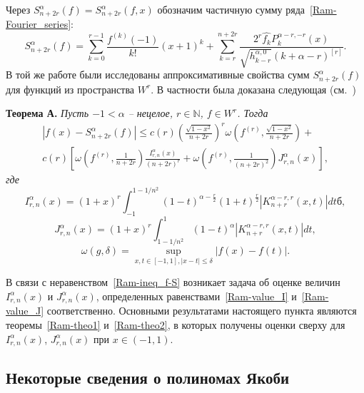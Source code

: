 Через $S^\alpha_{n+2r}(f)=S^\alpha_{n+2r}(f,x)$ обозначим частичную сумму ряда~\eqref{Ram-Fourier_series}:
$$
S^\alpha_{n+2r}(f)=\sum_{k=0}^{r-1}\frac{f^{(k)}(-1)}{k!}(x+1)^k+
\sum_{k=r}^{n+2r}\frac{2^r\widehat{f_k}P_k^{\alpha-r,-r}(x)}{\sqrt{h_{k-r}^{\alpha,0}}(k+\alpha-r)^{[r]}}.
$$
В той же работе были исследованы аппроксимативные свойства сумм $S^\alpha_{n+2r}(f)$ для функций из пространства $W^r$. В частности была доказана следующая (см.~\cite[теорема 4]{Ram-SharMN})

\textbf{Теорема А.}
\textit{Пусть $-1<\alpha$ -- нецелое, $r\in\mathbb{N}$, $f\in W^r$. Тогда
\begin{multline}\label{Ram-ineq_f-S}
|f(x)-S^\alpha_{n+2r}(f)|\le c(r)\left(\frac{\sqrt{1-x^2}}{n+2r}\right)^r\omega\left(f^{(r)},\frac{\sqrt{1-x^2}}{n+2r}\right)+ \\
c(r)\left[\omega\left(f^{(r)},\frac{1}{n+2r}\right)\frac{I_{r,n}^\alpha(x)}{(n+2r)^r}+\omega\left(f^{(r)},\frac{1}{(n+2r)^2}\right)J_{r,n}^\alpha(x)\right],
\end{multline}
где
\begin{equation}\label{Ram-value_I}
I_{r,n}^\alpha(x)=(1+x)^r\int_{-1}^{1-1/n^2}(1-t)^{\alpha-\frac{r}{2}}(1+t)^{\frac{r}{2}}|K_{n+r}^{\alpha-r,r}(x,t)|dtб,
\end{equation}
\begin{equation}\label{Ram-value_J}
J_{r,n}^\alpha(x)=(1+x)^r\int_{1-1/n^2}^{1}(1-t)^{\alpha}|K_{n+r}^{\alpha-r,r}(x,t)|dt,
\end{equation}
$$
\omega(g,\delta)=\sup_{x,t\in[-1,1], |x-t|\le\delta}|f(x)-f(t)|.
$$
}

В связи с неравенством~\eqref{Ram-ineq_f-S} возникает задача об оценке величин $I_{r,n}^\alpha(x)$ и $J_{r,n}^\alpha(x)$, определенных равенствами~\eqref{Ram-value_I} и~\eqref{Ram-value_J} соответственно. Основными результатами настоящего пункта являются теоремы~\ref{Ram-theo1} и~\ref{Ram-theo2}, в которых получены оценки сверху для $I_{r,n}^\alpha(x)$, $J_{r,n}^\alpha(x)$ при $x\in(-1,1)$.

\subsection{Некоторые сведения о полиномах Якоби}

